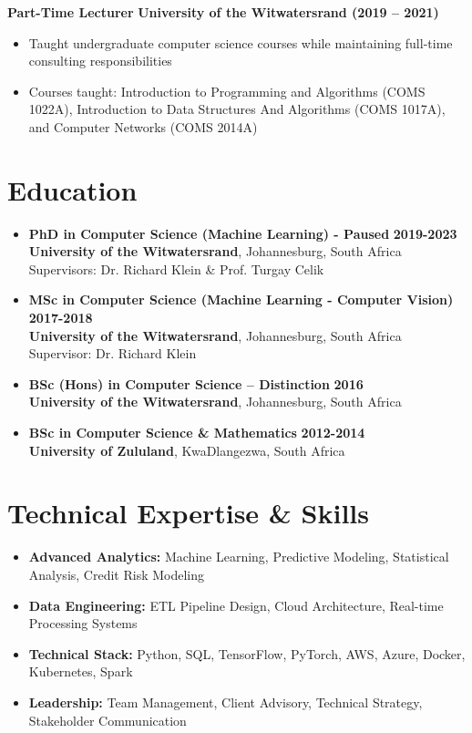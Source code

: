 \documentclass[a4paper,10pt]{article}
\begin{document}
\textbf{Part-Time Lecturer} \hfill \textbf{University of the Witwatersrand (2019 – 2021)}
\begin{itemize}[noitemsep,topsep=0pt]
    \item Taught undergraduate computer science courses while maintaining full-time consulting responsibilities
    \item Courses taught: Introduction to Programming and Algorithms (COMS 1022A), Introduction to Data Structures And Algorithms (COMS 1017A), and Computer Networks (COMS 2014A)
\end{itemize}

\section{Education}
\begin{itemize}[noitemsep,topsep=0pt]
    \item \textbf{PhD in Computer Science (Machine Learning) - Paused} \hfill \textbf{2019-2023}\\ 
    \textbf{University of the Witwatersrand}, Johannesburg, South Africa\\
    Supervisors: Dr. Richard Klein \& Prof. Turgay Celik
    
    \item \textbf{MSc in Computer Science (Machine Learning - Computer Vision)} \hfill \textbf{2017-2018}\\ 
    \textbf{University of the Witwatersrand}, Johannesburg, South Africa\\
    Supervisor: Dr. Richard Klein
    
    \item \textbf{BSc (Hons) in Computer Science – Distinction} \hfill \textbf{2016}\\ 
    \textbf{University of the Witwatersrand}, Johannesburg, South Africa
    
    \item \textbf{BSc in Computer Science \& Mathematics} \hfill \textbf{2012-2014}\\ 
    \textbf{University of Zululand}, KwaDlangezwa, South Africa
\end{itemize}

\section{Technical Expertise \& Skills}
\begin{itemize}[noitemsep,topsep=0pt]
    \item \textbf{Advanced Analytics:} Machine Learning, Predictive Modeling, Statistical Analysis, Credit Risk Modeling
    \item \textbf{Data Engineering:} ETL Pipeline Design, Cloud Architecture, Real-time Processing Systems
    \item \textbf{Technical Stack:} Python, SQL, TensorFlow, PyTorch, AWS, Azure, Docker, Kubernetes, Spark
    \item \textbf{Leadership:} Team Management, Client Advisory, Technical Strategy, Stakeholder Communication
\end{itemize}
\end{document}

